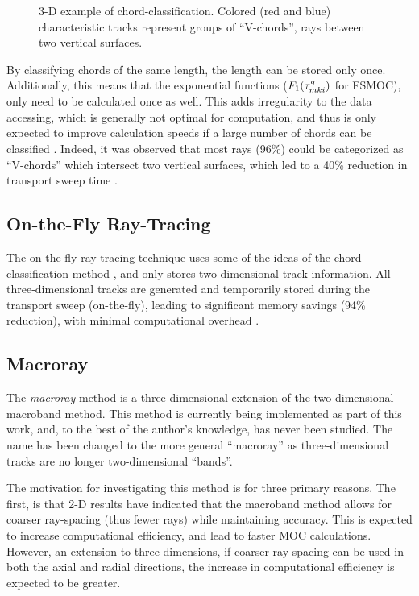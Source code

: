 {{{            \begin{figure}[h]
                \centering
                \def\svgwidth{0.45\linewidth}
                
                \caption{3-D example of chord-classification. Colored (red and blue) characteristic tracks represent groups of ``V-chords'', rays between two vertical surfaces.}
                \label{fig:RT:Chord-Classification}
            \end{figure}

            By classifying chords of the same length, the length can be stored only once.
            Additionally, this means that the exponential functions ($F_1(\segopt)$ for \ac{FSMOC}), only need to be calculated once as well.
            This adds irregularity to the data accessing, which is generally not optimal for computation, and thus is only expected to improve calculation speeds if a large number of chords can be classified \cite{Sciannandrone2016}.
            Indeed, it was observed that most rays (96\%) could be categorized as ``V-chords'' which intersect two vertical surfaces, which led to a 40\% reduction in transport sweep time \cite{Sciannandrone2016}.
        }
        \subsection{On-the-Fly Ray-Tracing}{\label{ssec:RT:On-the-Fly Ray-Tracing}
            The on-the-fly ray-tracing technique \cite{Gunow2016} uses some of the ideas of the chord-classification method \cite{Sciannandrone2016}, and only stores two-dimensional track information.
            All three-dimensional tracks are generated and temporarily stored during the transport sweep (on-the-fly), leading to significant memory savings (94\% reduction), with minimal computational overhead \cite{Gunow2016}.
        }
        \subsection{Macroray}{\label{ssec:RT:Macroray}
            The \emph{macroray} method is a three-dimensional extension of the two-dimensional macroband method.
            This method is currently being implemented as part of this work, and, to the best of the author's knowledge, has never been studied.
            The name has been changed to the more general ``macroray'' as three-dimensional tracks are no longer two-dimensional ``bands''.

            The motivation for investigating this method is for three primary reasons.
            The first, is that 2-D results \cite{Yamamoto2005,Fevotte2007,Yamamoto2008} have indicated that the macroband method allows for coarser ray-spacing (thus fewer rays) while maintaining accuracy.
            This is expected to increase computational efficiency, and lead to faster \ac{MOC} calculations.
            However, an extension to three-dimensions, if coarser ray-spacing can be used in both the axial and radial directions, the increase in computational efficiency is expected to be greater.

}}}
